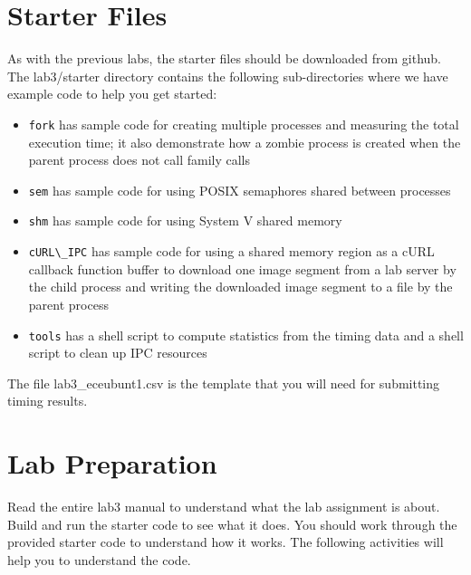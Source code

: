 \section{Starter Files}
As with the previous labs, the starter files should be downloaded from github. The lab3/starter directory contains the following sub-directories where we have example code to help you get started:
\begin{itemize}
\item \verb+fork+ has sample code for creating multiple processes and measuring the total execution time;
  it also demonstrate how a zombie process is created when the parent process does not call  family calls
\item \verb+sem+ has sample code for using POSIX semaphores shared between processes
\item \verb+shm+ has sample code for using System V shared memory
\item \verb+cURL\_IPC+ has sample code for using a shared memory region as a cURL callback function buffer to download one image segment from a lab server by the child process and writing the downloaded image segment to a file by the parent process
\item \verb+tools+ has a shell script to compute statistics from the timing data and a shell script to clean up IPC resources
\end{itemize}
The file lab3\_eceubunt1.csv is the template that you will need for submitting timing results.
\section{Lab Preparation}
Read the entire lab3 manual to understand what the lab assignment is about. Build and run the starter code to see what it does. You should work through the provided starter code to understand how it works. The following activities will help you to understand the code.

